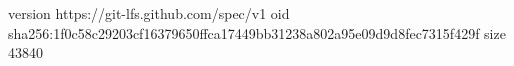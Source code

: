 version https://git-lfs.github.com/spec/v1
oid sha256:1f0c58c29203cf16379650ffca17449bb31238a802a95e09d9d8fec7315f429f
size 43840
